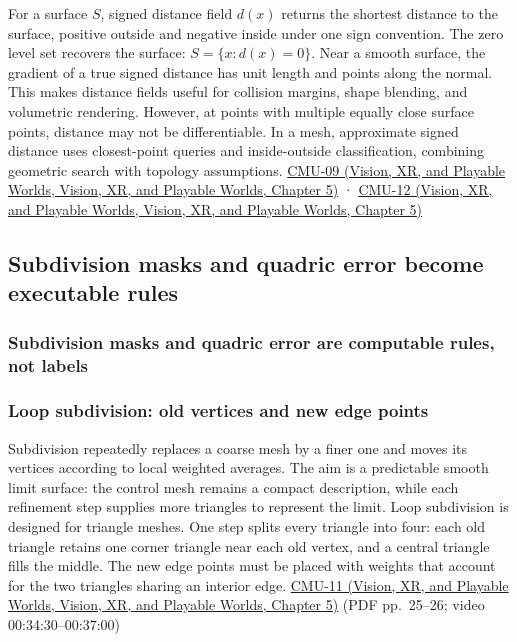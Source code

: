 For a surface \(S\), signed distance field \(d(x)\) returns the shortest distance to the surface, positive outside and negative inside under one sign convention. The zero level set recovers the surface: \(S=\{x:d(x)=0\}\). Near a smooth surface, the gradient of a true signed distance has unit length and points along the normal. This makes distance fields useful for collision margins, shape blending, and volumetric rendering. However, at points with multiple equally close surface points, distance may not be differentiable. In a mesh, approximate signed distance uses closest-point queries and inside-outside classification, combining geometric search with topology assumptions. \href{../07-Vision-XR-and-Playable-Worlds/main.pdf\#nameddest=04-visual-computing-ii-ch036-cmu-09---introduction-to-geometry}{CMU-09 (Vision, XR, and Playable Worlds, Vision, XR, and Playable Worlds, Chapter 5)} · \href{../07-Vision-XR-and-Playable-Worlds/main.pdf\#nameddest=04-visual-computing-ii-ch036-cmu-12---geometric-queries}{CMU-12 (Vision, XR, and Playable Worlds, Vision, XR, and Playable Worlds, Chapter 5)}

\subsection{Subdivision masks and quadric error become executable rules}\label{03-visual-computing-i-ch002-subdivision-masks-and-quadric-error-become-executable-rules}

\subsubsection{Subdivision masks and quadric error are computable rules, not labels}\label{03-visual-computing-i-ch002-subdivision-masks-and-quadric-error-are-computable-rules-not-labels}

\subsubsection{Loop subdivision: old vertices and new edge points}\label{03-visual-computing-i-ch002-loop-subdivision-old-vertices-and-new-edge-points}

Subdivision repeatedly replaces a coarse mesh by a finer one and moves its vertices according to local weighted averages. The aim is a predictable smooth limit surface: the control mesh remains a compact description, while each refinement step supplies more triangles to represent the limit. Loop subdivision is designed for triangle meshes. One step splits every triangle into four: each old triangle retains one corner triangle near each old vertex, and a central triangle fills the middle. The new edge points must be placed with weights that account for the two triangles sharing an interior edge. \href{../07-Vision-XR-and-Playable-Worlds/main.pdf\#nameddest=04-visual-computing-ii-ch036-cmu-11---digital-geometry-processing}{CMU-11 (Vision, XR, and Playable Worlds, Vision, XR, and Playable Worlds, Chapter 5)} (PDF pp.~25--26; video 00:34:30--00:37:00)

